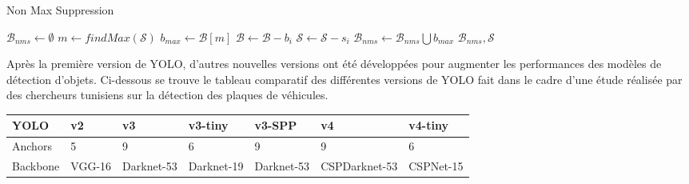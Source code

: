 \begin{itemize}
            \begin{algorithm}[H]
                \caption{Non Max Suppression}
                \begin{algorithmic}[1]
                 
                    \State $\mathcal{B}_{nms} \leftarrow \emptyset$
                        \State $m \leftarrow findMax(\mathcal{S})$  
                        \State $b_{max} \leftarrow \mathcal{B}[m]$
                                \State $\mathcal{B} \leftarrow \mathcal{B} - b_i$
                                \State $\mathcal{S} \leftarrow \mathcal{S} - s_i$
                            \EndIf
                        \EndFor
                        \State $\mathcal{B}_{nms} \leftarrow \mathcal{B}_{nms} \bigcup b_{max}$
                    \EndWhile 
                    \State \Return $\mathcal{B}_{nms}, \mathcal{S}$
                \EndFunction
                \end{algorithmic}
            \end{algorithm}
            Après la première version de YOLO, d’autres nouvelles versions ont été développées pour augmenter les performances des modèles de détection d’objets. Ci-dessous se trouve le tableau comparatif des différentes versions de YOLO fait dans le cadre d’une étude réalisée par des chercheurs tunisiens sur la détection des plaques de véhicules.
            \begin{table}[H]
                \centering
                \begin{threeparttable}[b]
                    \begin{tabular}{|l|l|l|l|l|l|l|}
                        \hline
                        \rowcolor{Gray}
                        \textbf{YOLO} & \textbf{v2} & \textbf{v3} & \textbf{v3-tiny} & \textbf{v3-SPP} & \textbf{v4} & \textbf{v4-tiny} \\ \hline
                        Anchors\tnote{1}  & 5 & 9 & 6 & 9 & 9 & 6 \\ \hline
                        Backbone\tnote{2} & VGG-16 & Darknet-53 & Darknet-19 & Darknet-53 & CSPDarknet-53 & CSPNet-15 \\ \hline

\end{tabular}
\end{threeparttable}
\end{table}
\end{itemize}
